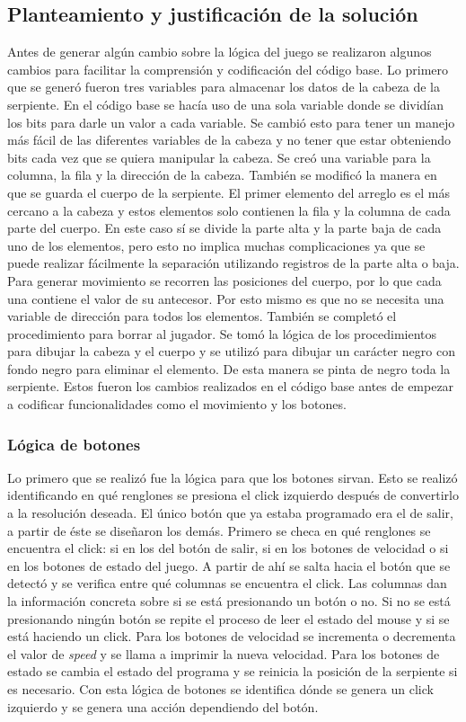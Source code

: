 \documentclass[12pt]{article}
\begin{document}
\subsection*{Planteamiento y justificación de la solución}
Antes de generar algún cambio sobre la lógica del juego se realizaron algunos cambios para facilitar la comprensión y codificación del código base. Lo primero que se generó fueron tres variables para almacenar los datos de la cabeza de la serpiente. En el código base se hacía uso de una sola variable donde se dividían los bits para darle un valor a cada variable. Se cambió esto para tener un manejo más fácil de las diferentes variables de la cabeza y no tener que estar obteniendo bits cada vez que se quiera manipular la cabeza. Se creó una variable para la columna, la fila y la dirección de la cabeza. También se modificó la manera en que se guarda el cuerpo de la serpiente. El primer elemento del arreglo es el más cercano a la cabeza y estos elementos solo contienen la fila y la columna de cada parte del cuerpo. En este caso sí se divide la parte alta y la parte baja de cada uno de los elementos, pero esto no implica muchas complicaciones ya que se puede realizar fácilmente la separación utilizando registros de la parte alta o baja. Para generar movimiento se recorren las posiciones del cuerpo, por lo que cada una contiene el valor de su antecesor. Por esto mismo es que no se necesita una variable de dirección para todos los elementos. También se completó el procedimiento para borrar al jugador. Se tomó la lógica de los procedimientos para dibujar la cabeza y el cuerpo y se utilizó para dibujar un carácter negro con fondo negro para eliminar el elemento. De esta manera se pinta de negro toda la serpiente. Estos fueron los cambios realizados en el código base antes de empezar a codificar funcionalidades como el movimiento y los botones.

\subsubsection*{Lógica de botones}
Lo primero que se realizó fue la lógica para que los botones sirvan. Esto se realizó identificando en qué renglones se presiona el click izquierdo después de convertirlo a la resolución deseada. El único botón que ya estaba programado era el de salir, a partir de éste se diseñaron los demás. Primero se checa en qué renglones se encuentra el click: si en los del botón de salir, si en los botones de velocidad o si en los botones de estado del juego. A partir de ahí se salta hacia el botón que se detectó y se verifica entre qué columnas se encuentra el click. Las columnas dan la información concreta sobre si se está presionando un botón o no. Si no se está presionando ningún botón se repite el proceso de leer el estado del mouse y si se está haciendo un click. Para los botones de velocidad se incrementa o decrementa el valor de \textit{speed} y se llama a imprimir la nueva velocidad. Para los botones de estado se cambia el estado del programa y se reinicia la posición de la serpiente si es necesario. Con esta lógica de botones se identifica dónde se genera un click izquierdo y se genera una acción dependiendo del botón.
\end{document}
